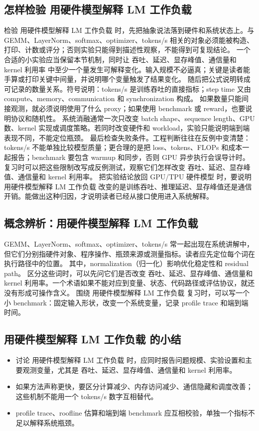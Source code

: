 \documentclass[a4paper]{article}
\begin{document}
\subsection{怎样检验 用硬件模型解释 LM 工作负载}
检验 用硬件模型解释 LM 工作负载 时，先把抽象说法落到硬件和系统状态上。与 GEMM、LayerNorm、softmax、optimizer、tokens/s 相关的对象必须能被构造、打印、计数或评分；否则实验只能得到描述性观察，不能得到可复现结论。
一个合适的小实验应当保留本节机制，同时让 吞吐、延迟、显存峰值、通信量和 kernel 利用率 中至少一个量发生可解释变化。输入规模不必逼真；关键是读者能手算或打印关键中间量，并说明哪个变量触发了结果变化。
随后把公式说明转成可记录的数量关系。符号说明：tokens/s 是训练吞吐的直接指标；step time 又由 compute、memory、communication 和 synchronization 构成。 如果数量只能间接观测，就必须说明使用了什么 proxy；如果使用 benchmark 或 reward，也要说明协议和随机性。
系统消融通常一次只改变 batch shape、sequence length、GPU 数、kernel 实现或调度策略。若同时改变硬件和 workload，实验只能说明端到端表现不同，不能定位瓶颈。
最后检查失败条件。工程判断往往在反例中变清楚：tokens/s 不能单独比较模型质量；更合理的是把 loss、tokens、FLOPs 和成本一起报告；benchmark 要包含 warmup 和同步，否则 GPU 异步执行会误导计时。复习时可以把这些限制改写成反例测试，观察它们怎样改变 吞吐、延迟、显存峰值、通信量和 kernel 利用率。
把实验结论放回 GPU/TPU 硬件模型 时，要说明 用硬件模型解释 LM 工作负载 改变的是训练吞吐、推理延迟、显存峰值还是通信开销。能做出这种归因，才说明读者已经从接口使用进入系统解释。
\subsection{概念辨析：用硬件模型解释 LM 工作负载}
GEMM、LayerNorm、softmax、optimizer、tokens/s 常一起出现在系统讲解中，但它们分别指硬件对象、程序操作、瓶颈来源或测量指标。读者应先定位每个词在执行路径中的位置。
其中，normalization（归一化）影响优化稳定性和 residual path。
区分这些词时，可以先问它们是否改变 吞吐、延迟、显存峰值、通信量和 kernel 利用率。一个术语如果不能对应到变量、状态、代码路径或评估协议，就还没有形成可操作含义。
围绕 用硬件模型解释 LM 工作负载 复习时，可以写一个小 benchmark：固定输入形状，改变一个系统变量，记录 profile trace 和端到端时间。
\subsection{用硬件模型解释 LM 工作负载 的小结}
\begin{itemize}
\item 讨论 用硬件模型解释 LM 工作负载 时，应同时报告问题规模、实验设置和主要观测变量，尤其是 吞吐、延迟、显存峰值、通信量和 kernel 利用率。
\item 如果方法声称更快，要区分计算减少、内存访问减少、通信隐藏和调度改善；这些机制不能用一个 tokens/s 数字互相替代。
\item profile trace、roofline 估算和端到端 benchmark 应互相校验，单独一个指标不足以解释系统瓶颈。
\end{itemize}
\end{document}
